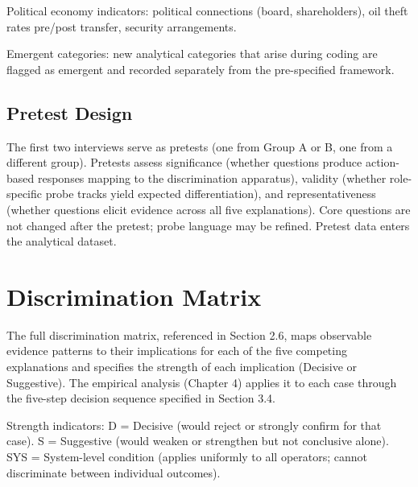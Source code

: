 \documentclass[twoside,fontset=lmodern]{mitthesis}
\begin{document}
Political economy indicators: political connections (board,
shareholders), oil theft rates pre/post transfer, security arrangements.

Emergent categories: new analytical categories that arise during coding
are flagged as emergent and recorded separately from the pre-specified
framework.

\hypertarget{pretest-design}{%
\section{Pretest Design}\label{pretest-design}}

The first two interviews serve as pretests (one from Group A or B, one
from a different group). Pretests assess significance (whether questions
produce action-based responses mapping to the discrimination apparatus),
validity (whether role-specific probe tracks yield expected
differentiation), and representativeness (whether questions elicit
evidence across all five explanations). Core questions are not changed
after the pretest; probe language may be refined. Pretest data enters
the analytical dataset.


\hypertarget{discrimination-matrix}{%
\chapter{Discrimination Matrix}\label{discrimination-matrix}}

The full discrimination matrix, referenced in Section 2.6, maps
observable evidence patterns to their implications for each of the five
competing explanations and specifies the strength of each implication
(Decisive or Suggestive). The empirical analysis (Chapter 4) applies it
to each case through the five-step decision sequence specified in
Section 3.4.

Strength indicators: D = Decisive (would reject or strongly confirm for
that case). S = Suggestive (would weaken or strengthen but not
conclusive alone). SYS = System-level condition (applies uniformly to
all operators; cannot discriminate between individual outcomes).
\end{document}
